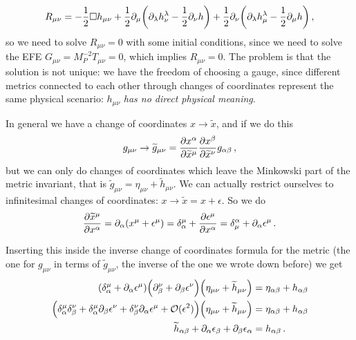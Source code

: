 \documentclass[main.tex]{subfiles}
\begin{document}
%
\begin{align}
R_{\mu \nu } = - \frac{1}{2} \square h_{\mu \nu } 
+ \frac{1}{2} \partial_{\mu } \qty(\partial_{\lambda } h^{\lambda }_{\nu } - \frac{1}{2} \partial_{\nu }h)
+ \frac{1}{2} \partial_{\nu }\qty(\partial_{\lambda}  h^{\lambda }_{\mu } - \frac{1}{2} \partial_{\mu} h)
\,,
\end{align}
%
so we need to solve \(R_{\mu \nu }  =0 \) with some initial conditions, since we need to solve the EFE \(G_{\mu \nu } = M_P^{-2} T_{\mu \nu } = 0\), which implies \(R_{\mu \nu }= 0 \). 
The problem is that the solution is not unique: we have the freedom of choosing a gauge, since different metrics connected to each other through changes of coordinates represent the same physical scenario: \(h_{\mu \nu } \) \emph{has no direct physical meaning}. 

In general we have a change of coordinates \(x \to \widetilde{x}\), and if we do this 
%
\begin{align}
g_{\mu \nu } \to \widetilde{g}_{\mu \nu } = \pdv{x^{\alpha }}{\widetilde{x}^{\mu  }} \pdv{x^{\beta }}{\widetilde{x}^{\nu }} g_{\alpha \beta }
\,,
\end{align}
%
but we can only do changes of coordinates which leave the Minkowski part of the metric invariant, that is \(\widetilde{g}_{\mu \nu } = \eta_{\mu \nu } + \widetilde{h}_{\mu \nu }\). We can actually restrict ourselves to infinitesimal changes of coordinates: \(x \to \widetilde{x} = x + \epsilon \). So we do 
%
\begin{align}
\pdv{\widetilde{x}^{\mu }}{x^{\alpha }} = \partial_{\alpha } \qty( x^{ \mu } + \epsilon^{\mu })
= \delta_{\alpha }^{\mu } + \pdv{\epsilon^{\mu }}{x^{\alpha }} = \delta_{\mu }^{\alpha } + \partial_{\alpha } \epsilon^{\mu }
\,.
\end{align}

Inserting this inside the inverse change of coordinates formula for the metric (the one for \(g_{\mu \nu }\) in terms of \(\widetilde{g}_{\mu \nu }\), the inverse of the one we wrote down before) we get 
%
\begin{subequations}
\begin{align}
\qty(\delta^{\mu}_{\alpha } + \partial_{\alpha } \epsilon^{\mu }) \qty(\partial^{\nu }_{\beta } + \partial_{\beta } \epsilon^{\nu }) \qty(\eta_{\mu \nu } + \widetilde{h}_{\mu \nu }) &= \eta_{\alpha \beta } +h_{\alpha \beta }  \\
\qty(\delta^{\mu }_{\alpha } \delta^{\nu }_{\beta } + \delta^{\mu }_{\alpha } \partial_{\beta } \epsilon^{\nu } 
+ \delta^{\nu  }_{\beta  } \partial_{\alpha  } \epsilon^{\mu  } + \mathcal{O} (\epsilon^2))  \qty(\eta_{\mu \nu } + \widetilde{h}_{\mu \nu }) &= \eta_{\alpha \beta }  + h_{\alpha \beta }  \\
\widetilde{h}_{\alpha \beta }+
\partial_{\alpha } \epsilon_{\beta } + \partial_{\beta } \epsilon_{\alpha } &= h_{\alpha \beta } 
\,.
\end{align}
\end{subequations}
\end{document}
